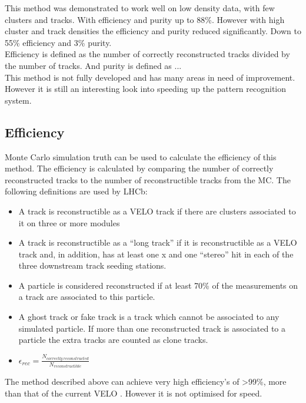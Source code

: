 This method was demonstrated to work well on low density data, with few clusters and tracks. With efficiency and purity up to 88\%. However with high cluster and track densities the efficiency and purity reduced significantly. Down to 55\% efficiency and 3\% purity.\\
Efficiency is defined as the number of correctly reconstructed tracks divided by the number of tracks. And purity is defined as ...\\
This method is not fully developed and has many areas in need of improvement. However it is still an interesting look into speeding up the pattern recognition system.


\subsection{Efficiency}
Monte Carlo simulation truth can be used to calculate the efficiency of this method. The efficiency is calculated by comparing the number of correctly reconstructed tracks to the number of reconstructible tracks from the MC. The following definitions are used by LHCb:

\begin{itemize}
    \item A track is reconstructible as a VELO track if there are clusters associated to it on three or more modules
    \item A track is reconstructible as a “long track” if it is reconstructible as a VELO track and, in addition, has at least one x and one “stereo” hit in each of the three downstream track seeding stations.
    \item A particle is considered reconstructed if at least 70\% of the measurements on a track are associated to this particle.
    \item A ghost track or fake track is a track which cannot be associated to any simulated particle.  If more than one reconstructed track is associated to a particle the extra tracks are counted as clone tracks.
    \item $\epsilon_{rec}=\frac{N_{correctly\ reconstructed}}{N_{reconstructible}}$
\end{itemize}
The method described above can achieve very high efficiency's of >99\%, more than that of the current VELO \cite{Collaboration:1624070}. However it is not optimised for speed.

